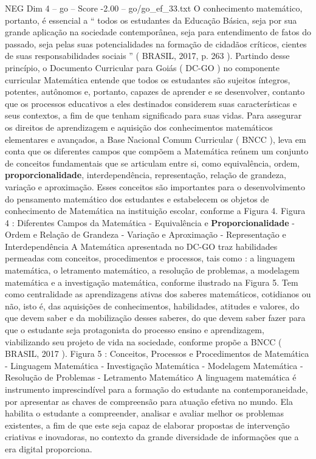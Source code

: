 \begin{textsample}{NEG Dim 4 – go – Score -2.00 – go/go\_ef\_33.txt}
O conhecimento matemático, portanto, é essencial a “ todos os estudantes da Educação Básica, seja por sua grande aplicação na sociedade contemporânea, seja para entendimento de fatos do passado, seja pelas suas potencialidades na formação de cidadãos críticos, cientes de suas responsabilidades sociais ” ( BRASIL, 2017, p. 263 ).
Partindo desse princípio, o Documento Curricular para Goiás ( DC-GO ) no componente curricular Matemática entende que todos os estudantes são sujeitos íntegros, potentes, autônomos e, portanto, capazes de aprender e se desenvolver, contanto que os processos educativos a eles destinados considerem suas características e seus contextos, a fim de que tenham significado para suas vidas.
Para assegurar os direitos de aprendizagem e aquisição dos conhecimentos matemáticos elementares e avançados, a Base Nacional Comum Curricular ( BNCC ), leva em conta que os diferentes campos que compõem a Matemática reúnem um conjunto de conceitos fundamentais que se articulam entre si, como equivalência, ordem, \textbf{proporcionalidade}, interdependência, representação, relação de grandeza, variação e aproximação.
Esses conceitos são importantes para o desenvolvimento do pensamento matemático dos estudantes e estabelecem os objetos de conhecimento de Matemática na instituição escolar, conforme a Figura 4.
Figura 4 : Diferentes Campos da Matemática - Equivalência e \textbf{Proporcionalidade} - Ordem e Relação de Grandeza - Variação e Aproximação - Representação e Interdependência A Matemática apresentada no DC-GO traz habilidades permeadas com conceitos, procedimentos e processos, tais como : a linguagem matemática, o letramento matemático, a resolução de problemas, a modelagem matemática e a investigação matemática, conforme ilustrado na Figura 5.
Tem como centralidade as aprendizagens ativas dos saberes matemáticos, cotidianos ou não, isto é, das aquisições de conhecimentos, habilidades, atitudes e valores, do que devem saber e da mobilização desses saberes, do que devem saber fazer para que o estudante seja protagonista do processo ensino e aprendizagem, viabilizando seu projeto de vida na sociedade, conforme propõe a BNCC ( BRASIL, 2017 ).
Figura 5 : Conceitos, Processos e Procedimentos de Matemática - Linguagem Matemática - Investigação Matemática - Modelagem Matemática - Resolução de Problemas - Letramento Matemático A linguagem matemática é instrumento imprescindível para a formação do estudante na contemporaneidade, por apresentar as chaves de compreensão para atuação efetiva no mundo.
Ela habilita o estudante a compreender, analisar e avaliar melhor os problemas existentes, a fim de que este seja capaz de elaborar propostas de intervenção criativas e inovadoras, no contexto da grande diversidade de informações que a era digital proporciona.

\end{textsample}
